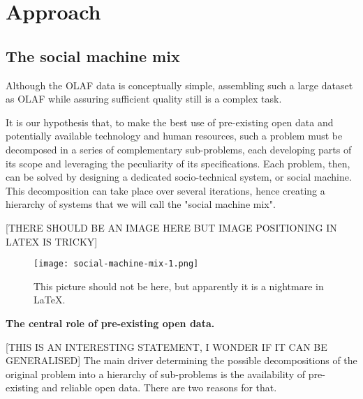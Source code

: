 \section{Approach}

\subsection{The social machine mix}

    Although the OLAF data is conceptually simple, assembling such a large dataset as OLAF while assuring sufficient quality still is a complex task.
    
    It is our hypothesis that, to make the best use of pre-existing open data and potentially available technology and human resources, such a problem must be decomposed in a series of complementary sub-problems, each developing parts of its scope and leveraging the peculiarity of its specifications. Each problem, then, can be solved by designing a dedicated socio-technical system, or social machine. This decomposition can take place over several iterations, hence creating a hierarchy of systems that we will call the "social machine mix". 
    
    [THERE SHOULD BE AN IMAGE HERE BUT IMAGE POSITIONING IN LATEX IS TRICKY]

    \begin{figure*}
    	\texttt{[image: social-machine-mix-1.png]}
    	\caption{This picture should not be here, but apparently it is a nightmare in LaTeX.}
    	\label{fig:social_machine_mix_1}
    \end{figure*}
    
    \textbf{The central role of pre-existing open data.} 
    
    [THIS IS AN INTERESTING STATEMENT, I WONDER IF IT CAN BE GENERALISED] The main driver determining the possible decompositions of the original problem into a hierarchy of sub-problems is the availability of pre-existing and reliable open data. There are two reasons for that.

